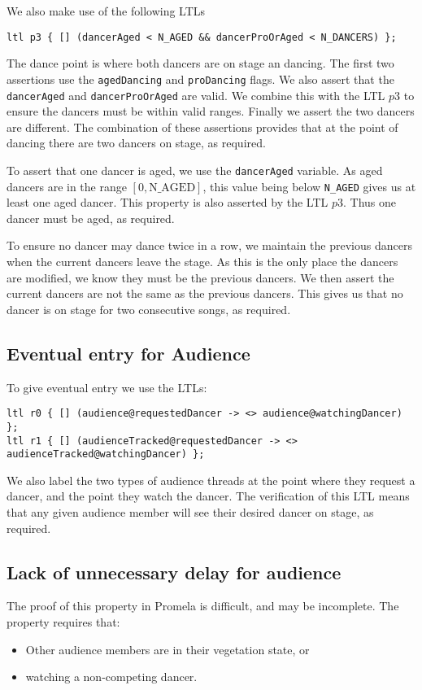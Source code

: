 \documentclass[12pt,a4paper]{scrartcl}
\begin{document}
We also make use of the following LTLs
\begin{lstlisting}
ltl p3 { [] (dancerAged < N_AGED && dancerProOrAged < N_DANCERS) };
\end{lstlisting}


The dance point is where both dancers are on stage an dancing.
The first two assertions use the \texttt{agedDancing} and \texttt{proDancing} flags.
We also assert that the \texttt{dancerAged} and \texttt{dancerProOrAged} are valid.
We combine this with the LTL $p3$ to ensure the dancers must be within valid ranges.
Finally we assert the two dancers are different.
The combination of these assertions provides that at the point of dancing there are two dancers on stage, as required.

To assert that one dancer is aged, we use the \texttt{dancerAged} variable.
As aged dancers are in the range $[0,\textrm{N\_AGED}]$, this value being below \texttt{N\_AGED} gives us at least one aged dancer.
This property is also asserted by the LTL $p3$.
Thus one dancer must be aged, as required.

To ensure no dancer may dance twice in a row, we maintain the previous dancers when the current dancers leave the stage.
As this is the only place the dancers are modified, we know they must be the previous dancers.
We then assert the current dancers are not the same as the previous dancers.
This gives us that no dancer is on stage for two consecutive songs, as required.

\subsection{Eventual entry for Audience}
To give eventual entry we use the LTLs:
\begin{lstlisting}
ltl r0 { [] (audience@requestedDancer -> <> audience@watchingDancer) };
ltl r1 { [] (audienceTracked@requestedDancer -> <> audienceTracked@watchingDancer) };
\end{lstlisting}
We also label the two types of audience threads at the point where they request a dancer, and the point they watch the dancer.
The verification of this LTL means that any given audience member will see their desired dancer on stage, as required.

\subsection{Lack of unnecessary delay for audience}
The proof of this property in Promela is difficult, and may be incomplete.
The property requires that:
\begin{itemize}
    \item Other audience members are in their vegetation state, or
    \item watching a non-competing dancer.
\end{itemize}
\end{document}
